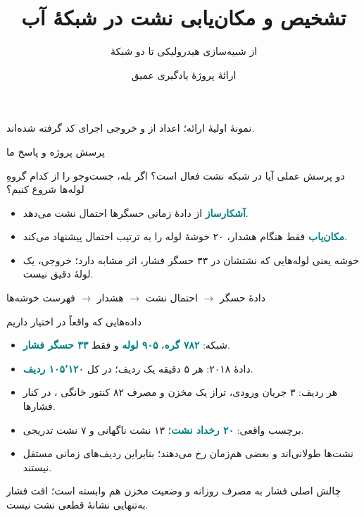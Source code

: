 \documentclass[aspectratio=169,11pt]{beamer}
\title{تشخیص و مکان‌یابی نشت در شبکهٔ آب \eng{L-Town}}
\subtitle{از شبیه‌سازی هیدرولیکی تا دو شبکهٔ \eng{MLP}}
\author{ارائهٔ پروژهٔ یادگیری عمیق}
\date{}
\newcommand{\key}[1]{\textcolor{teal}{\textbf{#1}}}
\newcommand{\eng}[1]{\lr{#1}}
\begin{document}
\begin{frame}
  \titlepage
  \vspace{-1em}
  \begin{center}\small نمونهٔ اولیهٔ ارائه؛ اعداد از \eng{report.md} و خروجی اجرای کد گرفته شده‌اند.\end{center}
\end{frame}

\begin{frame}{پرسش پروژه و پاسخ ما}
  \begin{block}{دو پرسش عملی}
  آیا در شبکه نشت فعال است؟ اگر بله، جست‌وجو را از کدام گروهِ لوله‌ها شروع کنیم؟
  \end{block}
  \begin{itemize}
  \item \key{آشکارساز} از دادهٔ زمانی حسگرها احتمال نشت می‌دهد.
  \item \key{مکان‌یاب} فقط هنگام هشدار، ۲۰ خوشهٔ لوله را به ترتیب احتمال پیشنهاد می‌کند.
  \item خوشه یعنی لوله‌هایی که نشتشان در ۳۳ حسگر فشار، اثر مشابه دارد؛ خروجی، یک لولهٔ دقیق نیست.
  \end{itemize}
  \vspace{0.3em}
  \begin{center}\color{navy}\large دادهٔ حسگر $\longrightarrow$ احتمال نشت $\longrightarrow$ هشدار $\longrightarrow$ فهرست خوشه‌ها\end{center}
\end{frame}

\begin{frame}{داده‌هایی که واقعاً در اختیار داریم}
  \begin{itemize}
  \item شبکه: \key{۷۸۲ گره}، \key{۹۰۵ لوله} و فقط \key{۳۳ حسگر فشار}.
  \item دادهٔ ۲۰۱۸: هر ۵ دقیقه یک ردیف؛ در کل \key{۱۰۵٬۱۲۰ ردیف}.
  \item هر ردیف: ۳ جریان ورودی، تراز یک مخزن و مصرف ۸۲ کنتور خانگی \eng{AMR}، در کنار فشارها.
  \item برچسب واقعی: \key{۲۰ رخداد نشت}؛ ۱۳ نشت ناگهانی و ۷ نشت تدریجی.
  \item نشت‌ها طولانی‌اند و بعضی هم‌زمان رخ می‌دهند؛ بنابراین ردیف‌های زمانی مستقل نیستند.
  \end{itemize}
  \begin{block}{چالش اصلی}
  فشار به مصرف روزانه و وضعیت مخزن هم وابسته است؛ افت فشار به‌تنهایی نشانهٔ قطعی نشت نیست.
  \end{block}
\end{frame}
\end{document}
